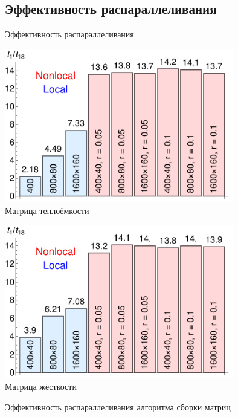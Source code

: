 \subsection{Эффективность распараллеливания}
\begin{frame}{Эффективность распараллеливания}
	\begin{minipage}{0.49\textwidth}
		\centering
		\includegraphics[width=0.75\textwidth]{pics/OMPThermalPresentation.pdf} \\
		Матрица теплоёмкости
	\end{minipage}
	\begin{minipage}{0.49\textwidth}
		\centering
		\includegraphics[width=0.75\textwidth]{pics/OMPMechanicalPresentation.pdf} \\
		Матрица жёсткости
	\end{minipage}
	\begin{center}
		Эффективность распараллеливания алгоритма сборки матриц
	\end{center}
	

\end{frame}
